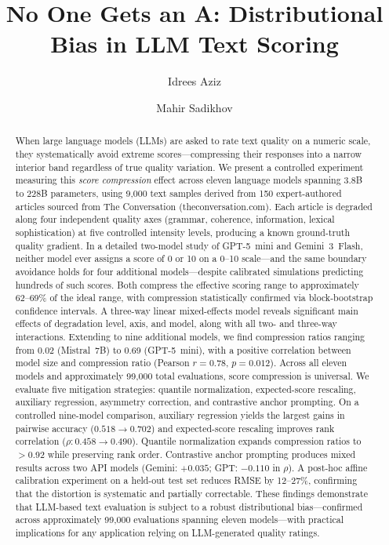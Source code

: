 \documentclass[11pt]{article}
\title{\textbf{No One Gets an A: Distributional Bias in LLM Text Scoring}}
\author{Idrees Aziz}
\author{Mahir Sadikhov}
\affil{Independent Researchers}
\date{}
\begin{document}
\maketitle

\begin{abstract}
When large language models (LLMs) are asked to rate text quality on a numeric scale, they systematically avoid extreme scores---compressing their responses into a narrow interior band regardless of true quality variation. We present a controlled experiment measuring this \emph{score compression} effect across eleven language models spanning 3.8B to 228B parameters, using 9{,}000 text samples derived from 150 expert-authored articles sourced from The Conversation (theconversation.com). Each article is degraded along four independent quality axes (grammar, coherence, information, lexical sophistication) at five controlled intensity levels, producing a known ground-truth quality gradient. In a detailed two-model study of GPT-5~mini and Gemini~3~Flash, neither model ever assigns a score of 0 or 10 on a 0--10 scale---and the same boundary avoidance holds for four additional models---despite calibrated simulations predicting hundreds of such scores. Both compress the effective scoring range to approximately 62--69\% of the ideal range, with compression statistically confirmed via block-bootstrap confidence intervals. A three-way linear mixed-effects model reveals significant main effects of degradation level, axis, and model, along with all two- and three-way interactions. Extending to nine additional models, we find compression ratios ranging from 0.02 (Mistral~7B) to 0.69 (GPT-5~mini), with a positive correlation between model size and compression ratio (Pearson $r = 0.78$, $p = 0.012$). Across all eleven models and approximately 99{,}000 total evaluations, score compression is universal. We evaluate five mitigation strategies: quantile normalization, expected-score rescaling, auxiliary regression, asymmetry correction, and contrastive anchor prompting. On a controlled nine-model comparison, auxiliary regression yields the largest gains in pairwise accuracy ($0.518 \to 0.702$) and expected-score rescaling improves rank correlation ($\rho: 0.458 \to 0.490$). Quantile normalization expands compression ratios to $>$0.92 while preserving rank order. Contrastive anchor prompting produces mixed results across two API models (Gemini: $+0.035$; GPT: $-0.110$ in $\rho$). A post-hoc affine calibration experiment on a held-out test set reduces RMSE by 12--27\%, confirming that the distortion is systematic and partially correctable. These findings demonstrate that LLM-based text evaluation is subject to a robust distributional bias---confirmed across approximately 99{,}000 evaluations spanning eleven models---with practical implications for any application relying on LLM-generated quality ratings.
\end{abstract}
\end{document}
